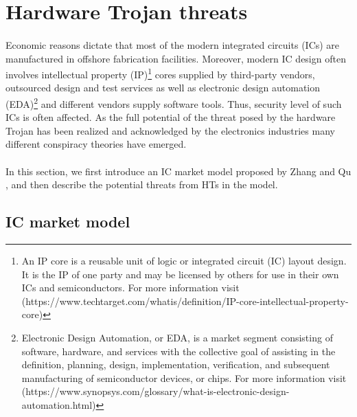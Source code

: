 \section{Hardware Trojan threats}
\paragraph*{}
Economic reasons dictate that most of the modern integrated circuits (ICs) are manufactured in offshore fabrication facilities. Moreover, modern IC design often involves intellectual property (IP)\footnote{An IP core is a reusable unit of logic or integrated circuit (IC) layout design. It is the IP of one party and may be licensed by others for use in their own ICs and semiconductors. For more information visit (https://www.techtarget.com/whatis/definition/IP-core-intellectual-property-core)} cores supplied by third-party vendors, outsourced design and test services as well as electronic design automation (EDA)\footnote{Electronic Design Automation, or EDA, is a market segment consisting of software, hardware, and services with the collective goal of assisting in the definition, planning, design, implementation, verification, and subsequent manufacturing of semiconductor devices, or chips. For more information visit (https://www.synopsys.com/glossary/what-is-electronic-design-automation.html)} and different vendors supply software tools. Thus, security level of such ICs is often affected. As the full potential of the threat posed by the hardware Trojan has been realized and acknowledged by the electronics industries many different conspiracy theories have emerged.
\paragraph*{}
In this section, we first introduce an IC market model proposed by Zhang and Qu \cite{zhang2014survey}, and then describe the potential threats from HTs in the model.
\subsection{IC market model}

